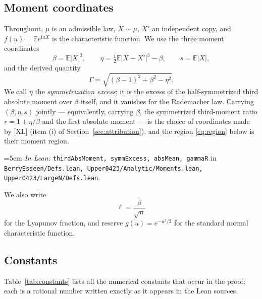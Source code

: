 \documentclass[11pt,a4paper]{article}
\theoremstyle{definition}
\newcommand{\EE}{\mathbb{E}}
\newcommand{\ii}{\mathrm{i}}
\newcommand{\Lean}[1]{\texttt{#1}}
\newcommand{\file}[1]{\texttt{#1}}
\newcommand{\formal}[2]{%
  \par\smallskip
  \begingroup\small\raggedright\emergencystretch=5em
  \noindent\textit{In Lean:} \Lean{#1} in \file{#2}.\par
  \endgroup\smallskip}
\begin{document}
\subsection{Moment coordinates}

Throughout, $\mu$ is an admissible law, $X\sim\mu$, $X'$ an independent copy, and
$f(u)=\EE e^{\ii uX}$ is the characteristic function. We use the three moment
coordinates
\begin{equation}
  \label{eq:coords}
  \beta=\EE|X|^3,\qquad
  \eta=\tfrac12\EE|X-X'|^3-\beta,\qquad
  s=\EE|X| ,
\end{equation}
and the derived quantity
\begin{equation}
  \label{eq:gamma}
  \Gamma=\sqrt{(\beta-1)^2+\beta^2-\eta^2} .
\end{equation}
We call $\eta$ the \emph{symmetrization excess}; it is the excess of the
half-symmetrized third absolute moment over $\beta$ itself, and it vanishes for
the Rademacher law. Carrying $(\beta,\eta,s)$ jointly --- equivalently, carrying
$\beta$, the symmetrized third-moment ratio $r=1+\eta/\beta$ and the first
absolute moment --- is the choice of coordinates made by [XL] (item (i) of
Section~\ref{sec:attribution}), and the region \eqref{eq:region} below is their
moment region.
\formal{thirdAbsMoment, symmExcess, absMean, gammaR}{BerryEsseen/Defs.lean, Upper0423/Analytic/Moments.lean, Upper0423/LargeN/Defs.lean}

We also write
\[
  \ell=\frac{\beta}{\sqrt n}
\]
for the Lyapunov fraction, and reserve $g(u)=e^{-u^2/2}$ for the standard normal
characteristic function.

\subsection{Constants}

Table~\ref{tab:constants} lists all the numerical constants that occur in the
proof; each is a rational number written exactly as it appears in the Lean
sources.
\end{document}
